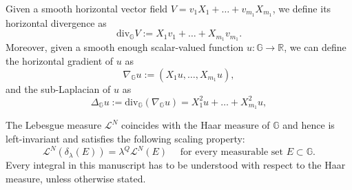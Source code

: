 \documentclass[11pt]{amsart}
\numberwithin{equation}{section} %
\theoremstyle{definition}
\newcommand{\mfk}{\mathfrak}
\def\g{\mfk{g}}
\newcommand{\cor}{\textit}
\begin{document}
Given a smooth horizontal vector field $V=v_1 X_1 + \ldots + v_{m_1}X_{m_1}$, we define its horizontal divergence as
\begin{equation}\label{eq:horizontal_divergence}
	\mathrm{div}_{\mathbb{G}}V := X_{1}v_1 + \ldots + X_{m_1}v_{m_1}.
\end{equation}
Moreover, given a smooth enough scalar-valued function $u:\mathbb{G}\to \mathbb{R}$, we can define
the horizontal gradient of $u$ as
\begin{equation}\label{eq:Horizontal_grad}
	\nabla_{\mathbb{G}}u := (X_{1}u, \ldots, X_{m_1}u),
\end{equation}
\noindent and the sub-Laplacian of $u$ as
\begin{equation}\label{eq:horizontal_lap}
	\Delta_{\mathbb{G}}u := \mathrm{div}_{\mathbb{G}}(\nabla_{\mathbb{G}}u) = X_1^2 u + \ldots + X_{m_1}^{2} u,
\end{equation}

The Lebesgue measure $\mathcal{L}^{N}$ coincides with the Haar measure of $\mathbb{G}$ and hence is left-invariant and satisfies the following scaling property:
\begin{equation}
	\mathcal{L}^{N}(\delta_{\lambda}(E)) = \lambda^{Q} \mathcal{L}^{N}(E) \quad \textrm{ for every measurable set } E \subset \mathbb{G}.	
\end{equation}
Every integral in this manuscript has to be understood
with respect to the Haar measure, unless otherwise stated.
\end{document}
